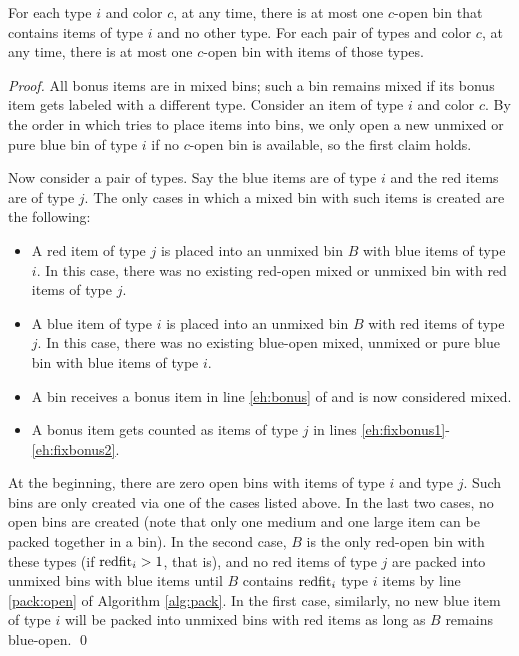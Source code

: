 \begin{aproperty}
	For each type $i$ and color $c$, at any time, there is at most one $c$-open bin that contains items of type $i$ and no other type.
	For each pair of types and color $c$, at any time, there is at most one $c$-open bin with items of those types.
\end{aproperty}
\begin{proof}
	All bonus items are in mixed bins; such a bin remains mixed if its bonus item gets labeled with a different type.
	Consider an item of type $i$ and color $c$.
By the order in which {\Pack} tries to place items into bins, we only open a new unmixed or pure blue bin of type $i$ if no $c$-open bin is available, so the first claim holds. 

Now consider a pair of types. Say the blue items are of type $i$ and the red items are of type $j$. 
The only cases in which a mixed bin with such items is created are the following:
\begin{itemize}
\item A red item of type $j$ is placed into an unmixed bin $B$ with blue items of type $i$. In this case, there was no existing 
red-open mixed or unmixed bin with red items of type $j$.
\item A blue item of type $i$ is placed into an unmixed bin $B$ with red items of type $j$.
In this case, there was no existing blue-open mixed, unmixed or pure blue bin with blue items of type $i$.
\item A bin receives a bonus item in line \ref{eh:bonus} of {\EHarm} and is now considered mixed.
\item A bonus item gets counted as items of type $j$ in lines \ref{eh:fixbonus1}-\ref{eh:fixbonus2}.
\end{itemize}

At the beginning, there are zero open bins with items of type $i$ and type $j$.
Such bins are only created via one of the cases listed above. 
In the last two cases, no open bins are created (note that only one medium and one large item can be packed together in a bin).
In the second case, $B$ is the only red-open bin with these types (if $\mathrm{redfit}_i>1$, that is), and no
red items of type $j$ are packed into unmixed bins with blue items until $B$ contains $\mathrm{redfit}_i$ type $i$
items by line \ref{pack:open} of Algorithm \ref{alg:pack}. In the first case, similarly, no new blue item of type $i$ will be packed into unmixed bins with red items
as long as $B$ remains blue-open.
\qed\end{proof}

